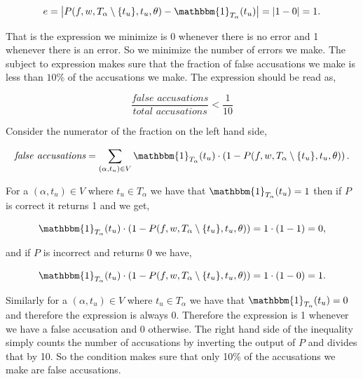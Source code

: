 \begin{equation}
    e = \left|
        P(f, w, T_\alpha \setminus \{t_u\}, t_u, \theta) -
        \mathbbm{1}_{T_\alpha}(t_u)
    \right| = |1 - 0| = 1.
\end{equation}

That is the expression we minimize is 0 whenever there is no error and 1
whenever there is an error. So we minimize the number of errors we make. The
subject to expression makes sure that the fraction of false accusations we make
is less than $10\%$ of the accusations we make. The expression should be read
as,

\begin{equation}
    \frac{\textit{false accusations}}{\textit{total accusations}} < \frac{1}{10}
\end{equation}

Consider the numerator of the fraction on the left hand side,

\begin{equation}
    \textit{false accusations} = \sum_{(\alpha, t_u) \in V}
    \mathbbm{1}_{T_\alpha}(t_u) \cdot
    \left(1 - P(f, w, T_\alpha \setminus \{t_u\}, t_u, \theta)\right).
\end{equation}

For a $(\alpha, t_u) \in V$ where $t_u \in T_\alpha$ we have that
$\mathbbm{1}_{T_\alpha}(t_u) = 1$ then if $P$ is correct it returns 1 and we
get,

\begin{equation}
    \mathbbm{1}_{T_\alpha}(t_u) \cdot
    \left(1 - P(f, w, T_\alpha \setminus \{t_u\}, t_u, \theta)\right) =
    1 \cdot (1 - 1) = 0,
\end{equation}

and if $P$ is incorrect and returns 0 we have,

\begin{equation}
    \mathbbm{1}_{T_\alpha}(t_u) \cdot
    \left(1 - P(f, w, T_\alpha \setminus \{t_u\}, t_u, \theta)\right) =
    1 \cdot (1 - 0) = 1.
\end{equation}

Similarly for a $(\alpha, t_u) \in V$ where $t_u \in T_\alpha$ we have that
$\mathbbm{1}_{T_\alpha}(t_u) = 0$ and therefore the expression is always
0. Therefore the expression is 1 whenever we have a false accusation and 0
otherwise. The right hand side of the inequality simply counts the number of
accusations by inverting the output of $P$ and divides that by 10. So the
condition makes sure that only 10\% of the accusations we make are false
accusations.

